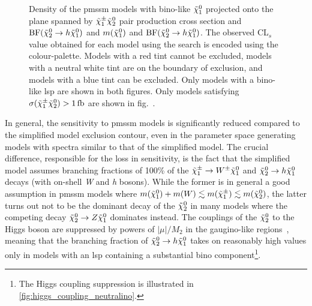 \begin{figure}
\begin{subfigure}[b]{0.5\linewidth}
		\vspace{-2em}
		\caption{\label{fig:fig_scatter_mchi10_BFHiggs_bino_withXsecCut}}
	\end{subfigure}\hfill
	\caption{Density of the \gls{pmssm} models with bino-like $\tilde{\chi}_1^0$ projected onto the plane spanned by  $\tilde{\chi}_1^\pm\tilde{\chi}_2^0$ pair production cross section and $\mathrm{BF}(\tilde{\chi}_2^0 \rightarrow h \tilde{\chi}_1^0)$ and  $m(\tilde{\chi}_1^0)$ and $\mathrm{BF}(\tilde{\chi}_2^0 \rightarrow h \tilde{\chi}_1^0)$. The observed CL$_s$ value obtained for each model using the \onelepton search is encoded using the colour-palette. Models with a red tint cannot be excluded, models with a neutral white tint are on the boundary of exclusion, and models with a blue tint can be excluded. Only models with a bino-like \gls{lsp} are shown in both figures. Only models satisfying $\sigma(\charg\neutr)>\SI{1}{\femto\barn}$ are shown in fig.~.}
	\label{fig:bino_sensitivity}
\end{figure}

In general, the sensitivity to \gls{pmssm} models is significantly reduced compared to the simplified model exclusion contour, even in the parameter space generating models with spectra similar to that of the simplified model. The crucial difference, responsible for the loss in sensitivity, is the fact that the simplified model assumes branching fractions of 100\% of the $\tilde{\chi}_1^\pm \rightarrow W^\pm \tilde{\chi}_1^0$ and $\tilde{\chi}_2^0 \rightarrow h \tilde{\chi}_1^0$ decays (with on-shell \textit{W} and \textit{h} bosons).
While the former is in general a good assumption in \gls{pmssm} models where $m(\tilde{\chi}_1^0)+m(W) \lesssim m(\tilde{\chi}_1^\pm)\lesssim m(\tilde{\chi}_2^0)$, the latter turns out not to be the dominant decay of the $\tilde{\chi}_2^0$ in many models where the competing decay $\tilde{\chi}_2^0 \rightarrow Z \tilde{\chi}_1^0$ dominates instead.
The couplings of the $\tilde{\chi}_2^0$ to the Higgs boson are suppressed by powers of $\vert\mu\vert/M_2$ in the gaugino-like regions~\cite{Arbey:2012fa}, meaning that the branching fraction of $\tilde{\chi}_2^0 \rightarrow h \tilde{\chi}_1^0$ takes on reasonably high values only in models with an \gls{lsp} containing a substantial bino component\footnote{The Higgs coupling suppression is illustrated in \cref{fig:higgs_coupling_neutralino}.}.

